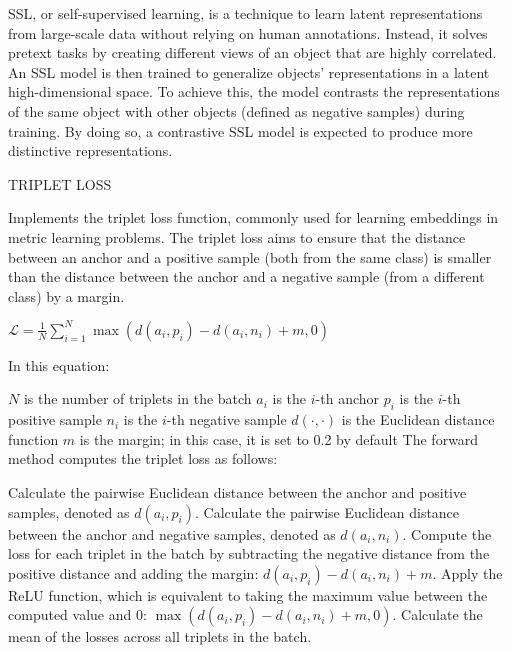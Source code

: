 SSL, or self-supervised learning, is a technique to learn latent representations from large-scale data without relying on human annotations. Instead, it solves pretext tasks by creating different views of an object that are highly correlated. An SSL model is then trained to generalize objects' representations in a latent high-dimensional space. To achieve this, the model contrasts the representations of the same object with other objects (defined as negative samples) during training. By doing so, a contrastive SSL model is expected to produce more distinctive representations. 

TRIPLET LOSS

 Implements the triplet loss function, commonly used for learning embeddings in metric learning problems. The triplet loss aims to ensure that the distance between an anchor and a positive sample (both from the same class) is smaller than the distance between the anchor and a negative sample (from a different class) by a margin.

$\mathcal{L} = \frac{1}{N}\sum_{i=1}^{N} \max \left( d\left(a_i, p_i\right) - d\left(a_i, n_i\right) + m, 0 \right)$

In this equation:

$N$ is the number of triplets in the batch
$a_i$ is the $i$-th anchor
$p_i$ is the $i$-th positive sample
$n_i$ is the $i$-th negative sample
$d(\cdot, \cdot)$ is the Euclidean distance function
$m$ is the margin; in this case, it is set to 0.2 by default
The forward method computes the triplet loss as follows:

Calculate the pairwise Euclidean distance between the anchor and positive samples, denoted as $d(a_i, p_i)$.
Calculate the pairwise Euclidean distance between the anchor and negative samples, denoted as $d(a_i, n_i)$.
Compute the loss for each triplet in the batch by subtracting the negative distance from the positive distance and adding the margin: $d(a_i, p_i) - d(a_i, n_i) + m$.
Apply the ReLU function, which is equivalent to taking the maximum value between the computed value and 0: $\max \left( d(a_i, p_i) - d(a_i, n_i) + m, 0 \right)$.
Calculate the mean of the losses across all triplets in the batch.